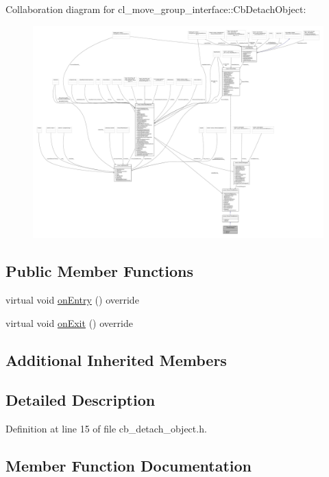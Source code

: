 Collaboration diagram for cl\+\_\+move\+\_\+group\+\_\+interface\+:\+:Cb\+Detach\+Object\+:
\nopagebreak
\begin{figure}[H]
\begin{center}
\leavevmode
\includegraphics[width=350pt]{classcl__move__group__interface_1_1CbDetachObject__coll__graph}
\end{center}
\end{figure}
\subsection*{Public Member Functions}
\begin{DoxyCompactItemize}
\item 
virtual void \hyperlink{classcl__move__group__interface_1_1CbDetachObject_a04af88f1d9b64c43eb2620ac5bd62c35}{on\+Entry} () override
\item 
virtual void \hyperlink{classcl__move__group__interface_1_1CbDetachObject_ae5c6ada3c6631c9fa0bfb2d461ce4678}{on\+Exit} () override
\end{DoxyCompactItemize}
\subsection*{Additional Inherited Members}


\subsection{Detailed Description}


Definition at line 15 of file cb\+\_\+detach\+\_\+object.\+h.



\subsection{Member Function Documentation}
\mbox{\label{classcl__move__group__interface_1_1CbDetachObject_a04af88f1d9b64c43eb2620ac5bd62c35}} 
